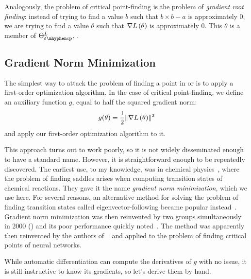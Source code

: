 \documentclass[../../thesis.tex]{subfiles}
\begin{document}
Analogously, the problem of critical point-finding
is the problem of \emph{gradient root finding}:
instead of trying to find a value $b$ such that
$b\times b - a$
is approximately $0$,
we are trying to find a value $\theta$ such that
$\nabla L\left(\theta\right)$
is approximately $0$.
This $\theta$ is a member of $\Theta^L_{\ecp}$,
.

\subsection{Gradient Norm Minimization}

The simplest way to attack the problem
of finding a point in
 or 
is to apply a first-order optimization algorithm.
In the case of critical point-finding,
we define an auxiliary function $g$,
equal to half the squared gradient norm:
\begin{equation}\equationlabel{def-g}
	g(\theta) = \frac{1}{2}\sgn{L}{\theta}
\end{equation}
\noindent and apply our first-order optimization algorithm to it.

This approach turns out to work poorly,
so it is not widely disseminated enough to have a standard name.
However, it is straightforward enough to be repeatedly discovered.
The earliest use, to my knowledge,
was in chemical physics~\cite{mciver1972},
where the problem of finding saddles arises
when computing transition states of chemical reactions.
They gave it the name \emph{gradient norm minimization},
which we use here.
For several reasons, an alternative method
for solving the problem of finding transition states
called eigenvector-following became popular instead~\cite{cerjan1981}.
Gradient norm minimization was then reinvented by two groups simultaneously in 2000
(\cite{angelani2000,broderix2000})
and its poor performance quickly noted~\cite{doye2002}.
The method was apparently then reinvented by the authors of%
~\cite{pennington2017}
and applied to the problem of finding critical points of neural networks.

While automatic differentiation can compute the derivatives of $g$ with no issue,
it is still instructive to know its gradients,
so let's derive them by hand.
\end{document}
